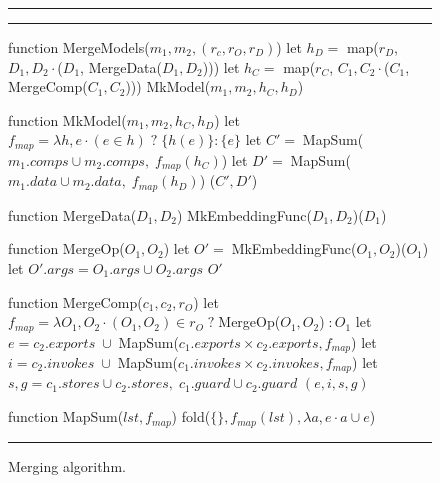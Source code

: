 
\begin{figure}[ht]
\hrule\hrule
\centering
  \begin{slangmath}[numbers=left,emph={MergeModels, MkMap, MkModel,%
                    MergeData, MergeComp, MergeOp, MapSum}]
function MergeModels($m_1, m_2, (r_c,r_O,r_D)$)
 let $h_D=$ map($r_D$, \lambda$D_1,D_2 \cdot$($D_1$, MergeData($D_1, D_2$)))
 let $h_C=$ map($r_C$, \lambda$C_1,C_2 \cdot$($C_1$, MergeComp($C_1, C_2$)))
 MkModel($m_1, m_2, h_C, h_D$)

function MkModel($m_1, m_2, h_C, h_D$)
 let $f_{map} = \lambda h,e \cdot (e \in h) \;?\; \{h(e)\} : \{e\}$
 let $C' =\; $MapSum($m_1.comps \cup m_2.comps,\; f_{map}(h_C)$)
 let $D' =\; $MapSum($m_1.data \cup m_2.data,\; f_{map}(h_D)$)
 ($C', D'$)

function MergeData($D_1, D_2$)
 MkEmbeddingFunc($D_1, D_2$)($D_1$)
 
function MergeOp($O_1, O_2$)
 let $O'=\; $MkEmbeddingFunc($O_1, O_2$)($O_1$)
 let $O'.args= O_1.args \cup O_2.args$ 
 $O'$

function MergeComp($c_1, c_2, r_O$)
 let $f_{map} = \lambda O_1,O_2 \cdot (O_1,O_2)\in r_O\;?\;$MergeOp($O_1,O_2$)$\;: O_1$
 let $e = c_2.exports\;\cup\;$MapSum($c_1.exports \times c_2.exports, f_{map}$)
 let $i = c_2.invokes\;\cup\;$MapSum($c_1.invokes \times c_2.invokes, f_{map}$)
 let $s, g = c_1.stores \cup c_2.stores,\; c_1.guard \cup c_2.guard$
 $(e, i, s, g)$

function MapSum($lst, f_{map}$)
 fold($\{\}, f_{map}(lst), \lambda a, e \cdot a \cup e$)
  \end{slangmath}
\hrule\vskip7pt
\caption{Merging algorithm.\label{fig-mergingin-alg-func}}
\end{figure}
